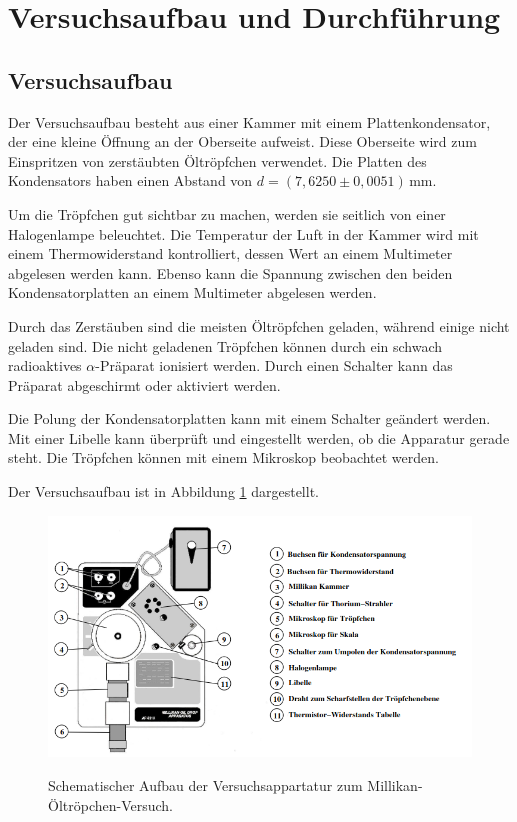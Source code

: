 \section{Versuchsaufbau und Durchführung}
\label{sec:Durchführung}

\subsection{Versuchsaufbau}
\label{subsec:Versuchsaufbau}
Der Versuchsaufbau besteht aus einer Kammer mit einem Plattenkondensator, der eine kleine Öffnung an der Oberseite aufweist. 
Diese Oberseite wird zum Einspritzen von zerstäubten Öltröpfchen verwendet. Die Platten des Kondensators haben einen Abstand 
von $d = (7,6250 \pm 0,0051) \, \si{\milli\meter}$.

Um die Tröpfchen gut sichtbar zu machen, werden sie seitlich von einer Halogenlampe beleuchtet. Die Temperatur der Luft in der 
Kammer wird mit einem Thermowiderstand kontrolliert, dessen Wert an einem Multimeter abgelesen werden kann. Ebenso kann die 
Spannung zwischen den beiden Kondensatorplatten an einem Multimeter abgelesen werden.

Durch das Zerstäuben sind die meisten Öltröpfchen geladen, während einige nicht geladen sind. Die nicht geladenen Tröpfchen 
können durch ein schwach radioaktives $\alpha$-Präparat ionisiert werden. Durch einen Schalter kann das Präparat abgeschirmt 
oder aktiviert werden.

Die Polung der Kondensatorplatten kann mit einem Schalter geändert werden. Mit einer Libelle kann überprüft und eingestellt 
werden, ob die Apparatur gerade steht. Die Tröpfchen können mit einem Mikroskop beobachtet werden.

Der Versuchsaufbau ist in Abbildung \ref{fig:Versuchsaufbau} dargestellt.

\begin{figure}[H]
    \centering
    \caption{Schematischer Aufbau der Versuchsappartatur zum Millikan-Öltröpchen-Versuch.\cite{1}}
    \includegraphics[width=\textwidth]{Bilder/Versuchsaufbau.png}
    \label{fig:Versuchsaufbau}
\end{figure}


